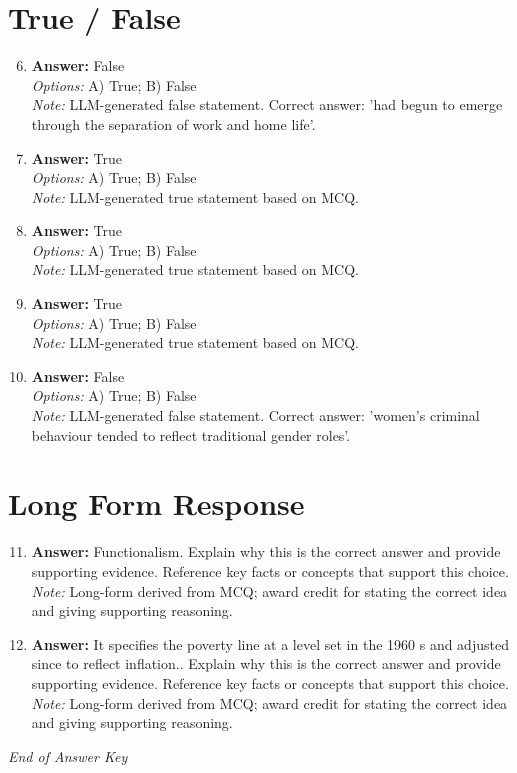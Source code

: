 \documentclass[12pt]{article}
\begin{document}
\section*{True / False}
\begin{enumerate}[label=\arabic*.]
\setcounter{enumi}{5}
\item \textbf{Answer:} False
\\ \textit{Options:} A) True; B) False
\\ \textit{Note:} LLM-generated false statement. Correct answer: 'had begun to emerge through the separation of work and home life'.
\item \textbf{Answer:} True
\\ \textit{Options:} A) True; B) False
\\ \textit{Note:} LLM-generated true statement based on MCQ.
\item \textbf{Answer:} True
\\ \textit{Options:} A) True; B) False
\\ \textit{Note:} LLM-generated true statement based on MCQ.
\item \textbf{Answer:} True
\\ \textit{Options:} A) True; B) False
\\ \textit{Note:} LLM-generated true statement based on MCQ.
\item \textbf{Answer:} False
\\ \textit{Options:} A) True; B) False
\\ \textit{Note:} LLM-generated false statement. Correct answer: 'women's criminal behaviour tended to reflect traditional gender roles'.
\end{enumerate}

\section*{Long Form Response}
\begin{enumerate}[label=\arabic*.]
\setcounter{enumi}{10}
\item \textbf{Answer:} Functionalism. Explain why this is the correct answer and provide supporting evidence. Reference key facts or concepts that support this choice.
\\ \textit{Note:} Long-form derived from MCQ; award credit for stating the correct idea and giving supporting reasoning.
\item \textbf{Answer:} It specifies the poverty line at a level set in the 1960 s and adjusted since to reflect inflation.. Explain why this is the correct answer and provide supporting evidence. Reference key facts or concepts that support this choice.
\\ \textit{Note:} Long-form derived from MCQ; award credit for stating the correct idea and giving supporting reasoning.
\end{enumerate}

\vfill
\noindent\textit{End of Answer Key}
\end{document}
